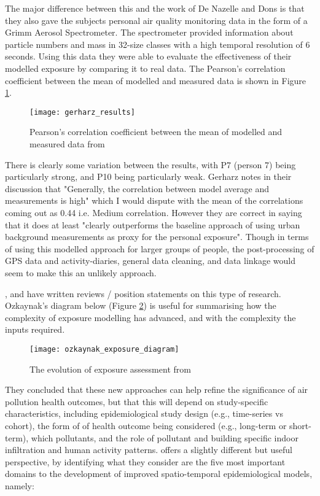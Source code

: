 The major difference between this and the work of De Nazelle and Dons is that they also gave the subjects personal air quality monitoring data in the form of a Grimm Aerosol Spectrometer. The spectrometer provided information about particle numbers and mass in 32-size classes with a high temporal resolution of 6 seconds. Using this data they were able to evaluate the effectiveness of their modelled exposure by comparing it to real data. The Pearson’s correlation coefficient between the mean of modelled and measured data is shown in Figure \ref{fig:gerharz_results}.

\begin{figure}[H]
\centering
\texttt{[image: gerharz\_results]}
\caption{Pearson’s correlation coefficient between the mean of modelled and measured data from \cite{Gerharz2013} }
\label{fig:gerharz_results}
\end{figure}

There is clearly some variation between the results, with P7 (person 7) being particularly strong, and P10 being particularly weak. Gerharz notes in their discussion that "Generally, the correlation between model average and measurements is high" which I would dispute with the mean of the correlations coming out as 0.44 i.e. Medium correlation. However they are correct in saying that it does at least "clearly outperforms the baseline approach of using urban background measurements as proxy for the personal exposure". Though in terms of using this modelled approach for larger groups of people, the post-processing of GPS data and activity-diaries, general data cleaning, and data linkage would seem to make this an unlikely approach.

\cite{Ozkaynak2013}, \cite{Meliker2011} and \cite{Baxter2013} have written reviews / position statements on this type of research. Ozkaynak's diagram below (Figure \ref{fig:ozkaynak_exposure_diagram}) is useful for summarising how the complexity of exposure modelling has advanced, and with the complexity the inputs required.

\begin{figure}[H]
\centering
\texttt{[image: ozkaynak\_exposure\_diagram]}
\caption{The evolution of exposure assessment from \cite{Ozkaynak2013}}
\label{fig:ozkaynak_exposure_diagram}
\end{figure}

They concluded that these new approaches can help refine the significance of air pollution health outcomes, but that this will depend on study-specific characteristics, including epidemiological study design (e.g., time-series vs cohort), the form of of health outcome being considered (e.g., long-term or short-term), which pollutants, and the role of pollutant and building specific indoor infiltration and human activity patterns. \cite{Meliker2011} offers a slightly different but useful perspective, by identifying what they consider are the five most important domains to the development of improved spatio-temporal epidemiological models, namely:

